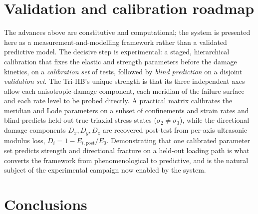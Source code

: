 \documentclass[11pt]{article}
\begin{document}
\section{Validation and calibration roadmap}\label{sec:roadmap}

The advances above are constitutive and computational; the system is presented
here as a measurement-and-modelling framework rather than a validated predictive
model. The decisive step is experimental: a staged, hierarchical calibration
that fixes the elastic and strength parameters before the damage kinetics, on a
\emph{calibration set} of tests, followed by \emph{blind prediction} on a disjoint
\emph{validation set}. The Tri-HB's unique strength is that its three independent
axes allow each anisotropic-damage component, each meridian of the failure
surface and each rate level to be probed directly. A practical matrix calibrates
the meridian and Lode parameters on a subset of confinements and strain rates and
blind-predicts held-out true-triaxial stress states ($\sigma_2\neq\sigma_3$),
while the directional damage components $D_x,D_y,D_z$ are
recovered post-test from per-axis ultrasonic modulus loss,
$D_i=1-E_{i,\mathrm{post}}/E_0$. Demonstrating that one calibrated parameter set
predicts strength and directional fracture on a held-out loading path is what
converts the framework from phenomenological to predictive, and is the natural
subject of the experimental campaign now enabled by the system.

\section{Conclusions}\label{sec:conclusion}
\end{document}
